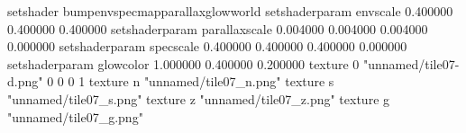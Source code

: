 setshader bumpenvspecmapparallaxglowworld
setshaderparam envscale 0.400000 0.400000 0.400000
setshaderparam parallaxscale 0.004000 0.004000 0.004000 0.000000
setshaderparam specscale 0.400000 0.400000 0.400000 0.000000
setshaderparam glowcolor 1.000000 0.400000 0.200000
texture 0 "unnamed/tile07-d.png" 0 0 0 1
texture n "unnamed/tile07_n.png"
texture s "unnamed/tile07_s.png"
texture z "unnamed/tile07_z.png"
texture g "unnamed/tile07_g.png"